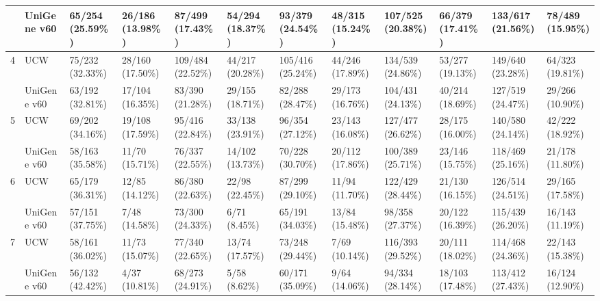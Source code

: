 \begin{sidewaystable}
\begin{localsize}{6}{7}
\begin{tabular}{llp{1cm}p{1cm}p{1cm}p{1cm}p{1cm}p{1cm}p{1cm}p{1cm}p{1cm}p{1cm}}
            & UniGene v60 & 65/254 (25.59\%)   & 26/186 (13.98\%)   & 87/499 (17.43\%)    & 54/294 (18.37\%)    & 93/379 (24.54\%)    & 48/315 (15.24\%)    & 107/525 (20.38\%)   & 66/379 (17.41\%)    & 133/617 (21.56\%)          & 78/489 (15.95\%)          \\
 \midrule
 4          & UCW         & 75/232 (32.33\%)   & 28/160 (17.50\%)   & 109/484 (22.52\%)   & 44/217 (20.28\%)    & 105/416 (25.24\%)   & 44/246 (17.89\%)    & 134/539 (24.86\%)   & 53/277 (19.13\%)    & 149/640 (23.28\%)          & 64/323 (19.81\%)          \\
            & UniGene v60 & 63/192 (32.81\%)   & 17/104 (16.35\%)   & 83/390 (21.28\%)    & 29/155 (18.71\%)    & 82/288 (28.47\%)    & 29/173 (16.76\%)    & 104/431 (24.13\%)   & 40/214 (18.69\%)    & 127/519 (24.47\%)          & 29/266 (10.90\%)          \\
 \midrule
 5          & UCW         & 69/202 (34.16\%)   & 19/108 (17.59\%)   & 95/416 (22.84\%)    & 33/138 (23.91\%)    & 96/354 (27.12\%)    & 23/143 (16.08\%)    & 127/477 (26.62\%)   & 28/175 (16.00\%)    & 140/580 (24.14\%)          & 42/222 (18.92\%)          \\
            & UniGene v60 & 58/163 (35.58\%)   & 11/70 (15.71\%)    & 76/337 (22.55\%)    & 14/102 (13.73\%)    & 70/228 (30.70\%)    & 20/112 (17.86\%)    & 100/389 (25.71\%)   & 23/146 (15.75\%)    & 118/469 (25.16\%)          & 21/178 (11.80\%)          \\
 \midrule
 6          & UCW         & 65/179 (36.31\%)   & 12/85 (14.12\%)    & 86/380 (22.63\%)    & 22/98 (22.45\%)     & 87/299 (29.10\%)    & 11/94 (11.70\%)     & 122/429 (28.44\%)   & 21/130 (16.15\%)    & 126/514 (24.51\%)          & 29/165 (17.58\%)          \\
            & UniGene v60 & 57/151 (37.75\%)   & 7/48 (14.58\%)     & 73/300 (24.33\%)    & 6/71     (8.45\%)   & 65/191 (34.03\%)    & 13/84 (15.48\%)     & 98/358 (27.37\%)    & 20/122 (16.39\%)    & 115/439 (26.20\%)          & 16/143 (11.19\%)          \\
 \midrule
 7          & UCW         & 58/161 (36.02\%)   & 11/73 (15.07\%)    & 77/340 (22.65\%)    & 13/74 (17.57\%)     & 73/248 (29.44\%)    & 7/69 (10.14\%)      & 116/393 (29.52\%)   & 20/111 (18.02\%)    & 114/468 (24.36\%)          & 22/143 (15.38\%)          \\
            & UniGene v60 & 56/132 (42.42\%)   & 4/37 (10.81\%)     & 68/273 (24.91\%)    & 5/58    (8.62\%)    & 60/171 (35.09\%)    & 9/64 (14.06\%)      & 94/334 (28.14\%)    & 18/103 (17.48\%)    & 113/412 (27.43\%)          & 16/124 (12.90\%)          \\

\end{tabular}
\end{localsize}
\end{sidewaystable}
